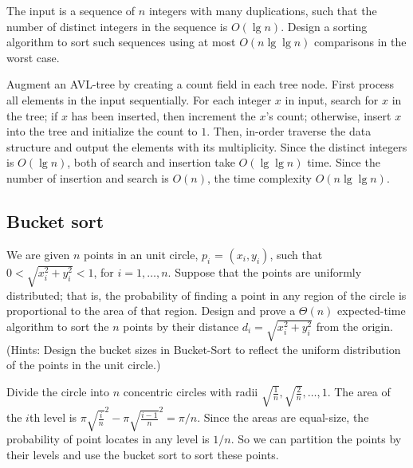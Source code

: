 \begin{Exercise}[origin={NCU CSIE 98}]
The input is a sequence of $n$ integers with many duplications, such that the number of distinct integers in the sequence is $O(\lg n)$.
Design a sorting algorithm to sort such sequences using at most $O(n \lg \lg n)$ comparisons in the worst case.
\end{Exercise}
\begin{Answer}
Augment an AVL-tree by creating a count field in each tree node. First process all elements in the input sequentially. For each integer $x$ in input, search for $x$ in the tree; if $x$ has been inserted, then increment the $x$'s count; otherwise, insert $x$ into the tree and initialize the count to $1$. Then, in-order traverse the data structure and output the elements with its multiplicity. Since the distinct integers is $O(\lg n)$, both of search and insertion take $O(\lg \lg n)$ time. Since the number of insertion and search is $O(n)$, the time complexity $O(n \lg \lg n)$.
\end{Answer}

\subsection{Bucket sort}
\begin{Exercise}[origin={NDHU CSIE 97}]
We are given $n$ points in an unit circle, $ p_i$ = $(x_i, y_i)$, such that $0 < \sqrt{x_i^2 + y_i^2} < 1$, for $i = 1, \dots, n$. Suppose that the points are uniformly distributed; that is, the probability of finding a point in any region of the circle is proportional to the area of that region. Design and prove a $\Theta(n)$ expected-time algorithm to sort the $n$ points by their distance $d_i = \sqrt{x_i^2 + y_i^2}$ from the origin. (Hints: Design the bucket sizes in Bucket-Sort to reflect the uniform distribution of the points in the unit circle.)
\end{Exercise}
\begin{Answer}
Divide the circle into $n$ concentric circles with radii $\sqrt{\frac{1}{n}}, \sqrt{\frac{2}{n}}, \dots, 1$. The area of the $i$th level is $\pi {\sqrt{\frac{i}{n}}}^2 - \pi {\sqrt{\frac{i-1}{n}}}^2 = \pi/n$. Since the areas are equal-size, the probability of point locates in any level is $1/n$. So we can partition the points by their levels and use the bucket sort to sort these points.
\end{Answer}

